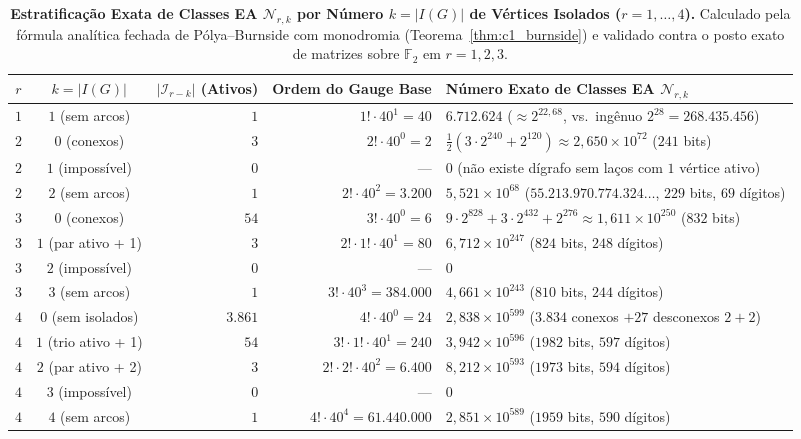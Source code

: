 \documentclass[11pt,a4paper]{article}
\theoremstyle{definition}
\theoremstyle{remark}
\newcommand{\F}{\mathbb{F}_2}
\begin{document}
\begin{table}[!htb]
  \centering
  \caption{\textbf{Estratificação Exata de Classes EA $\mathcal{N}_{r,k}$ por Número $k = |I(G)|$ de Vértices Isolados ($r = 1,\dots,4$).} Calculado pela fórmula analítica fechada de Pólya--Burnside com monodromia (Teorema~\ref{thm:c1_burnside}) e validado contra o posto exato de matrizes sobre $\F$ em $r=1,2,3$.}
  \label{tab:isolated_counts}
  \small
  \begin{tabularx}{\textwidth}{ccrrX}
    \toprule
    \textbf{$r$} & \textbf{$k = |I(G)|$} & \textbf{$|\mathcal{I}_{r-k}|$ (Ativos)} & \textbf{Ordem do Gauge Base} & \textbf{Número Exato de Classes EA $\mathcal{N}_{r,k}$} \\
    \midrule
    $1$ & $1$ (sem arcos) & $1$ & $1! \cdot 40^1 = 40$ & $6.712.624$ ($\approx 2^{22,68}$, vs.\ ingênuo $2^{28} = 268.435.456$) \\
    \midrule
    $2$ & $0$ (conexos) & $3$ & $2! \cdot 40^0 = 2$ & $\frac{1}{2}(3\cdot 2^{240} + 2^{120}) \approx 2,650 \times 10^{72}$ ($241$ bits) \\
    $2$ & $1$ (impossível) & $0$ & --- & $0$ (não existe dígrafo sem laços com $1$ vértice ativo) \\
    $2$ & $2$ (sem arcos) & $1$ & $2! \cdot 40^2 = 3.200$ & $5,521 \times 10^{68}$ ($55.213.970.774.324\dots$, $229$ bits, $69$ dígitos) \\
    \midrule
    $3$ & $0$ (conexos) & $54$ & $3! \cdot 40^0 = 6$ & $9\cdot 2^{828} + 3\cdot 2^{432} + 2^{276} \approx 1,611 \times 10^{250}$ ($832$ bits) \\
    $3$ & $1$ (par ativo + 1) & $3$ & $2! \cdot 1! \cdot 40^1 = 80$ & $6,712 \times 10^{247}$ ($824$ bits, $248$ dígitos) \\
    $3$ & $2$ (impossível) & $0$ & --- & $0$ \\
    $3$ & $3$ (sem arcos) & $1$ & $3! \cdot 40^3 = 384.000$ & $4,661 \times 10^{243}$ ($810$ bits, $244$ dígitos) \\
    \midrule
    $4$ & $0$ (sem isolados) & $3.861$ & $4! \cdot 40^0 = 24$ & $2,838 \times 10^{599}$ ($3.834$ conexos $+ 27$ desconexos $2+2$) \\
    $4$ & $1$ (trio ativo + 1) & $54$ & $3! \cdot 1! \cdot 40^1 = 240$ & $3,942 \times 10^{596}$ ($1982$ bits, $597$ dígitos) \\
    $4$ & $2$ (par ativo + 2) & $3$ & $2! \cdot 2! \cdot 40^2 = 6.400$ & $8,212 \times 10^{593}$ ($1973$ bits, $594$ dígitos) \\
    $4$ & $3$ (impossível) & $0$ & --- & $0$ \\
    $4$ & $4$ (sem arcos) & $1$ & $4! \cdot 40^4 = 61.440.000$ & $2,851 \times 10^{589}$ ($1959$ bits, $590$ dígitos) \\
    \bottomrule
  \end{tabularx}
\end{table}
\end{document}
